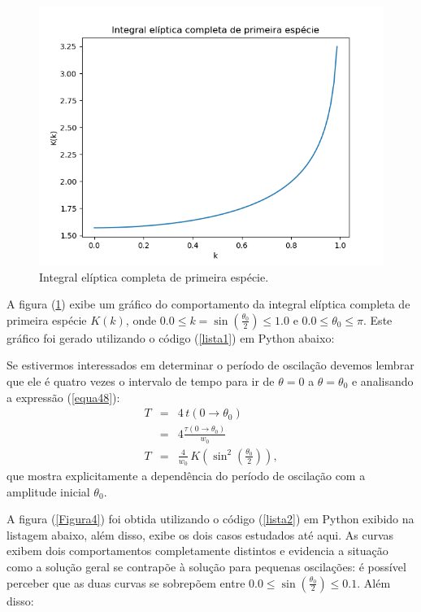 \documentclass[12pt,openright,twoside,english,brazil]{abntex2}
\begin{document}
\begin{figure}
 \begin{center}
  \includegraphics[scale=0.5]{Eliptica.png}
 \end{center}
 \caption{Integral elíptica completa de primeira espécie.}
 \label{Figura3}
\end{figure}

A figura (\ref{Figura3}) exibe um gráfico do comportamento da integral elíptica completa de primeira espécie $K(k)$, onde $0.0 \leq k=\sin{\left( \frac{\theta_0}{2} \right)} \leq 1.0$ e $0.0 \leq \theta_0 \leq \pi$. Este gráfico foi gerado utilizando o código (\ref{lista1}) em Python abaixo:


 
Se estivermos interessados em determinar o período de oscilação devemos lembrar que ele é quatro vezes o intervalo de tempo para ir de $\theta=0$ a $\theta=\theta_0$ e analisando a expressão (\ref{equa48}):
\begin{eqnarray}
T & = & 4\, t(0\rightarrow \theta_0) \nonumber \\
& = & 4 \frac{\tau(0\rightarrow \theta_0)}{w_0} \nonumber \\
T & = & \frac{4}{w_0}\, K\left( \sin^2{\left( \frac{\theta_0}{2} \right) }\right),
 \label{equa53}
\end{eqnarray}
que mostra explicitamente a dependência do período de oscilação com a amplitude inicial $\theta_0$.

A figura (\ref{Figura4}) foi obtida utilizando o código (\ref{lista2}) em Python exibido na listagem abaixo, além disso, exibe os dois casos estudados até aqui. As curvas exibem dois comportamentos completamente distintos e evidencia a situação como a solução geral se contrapõe à solução para pequenas oscilações: é possível perceber que as duas curvas se sobrepõem entre $0.0 \leq \sin{(\frac{\theta_0}{2} )} \leq 0.1$. Além disso:
\end{document}
